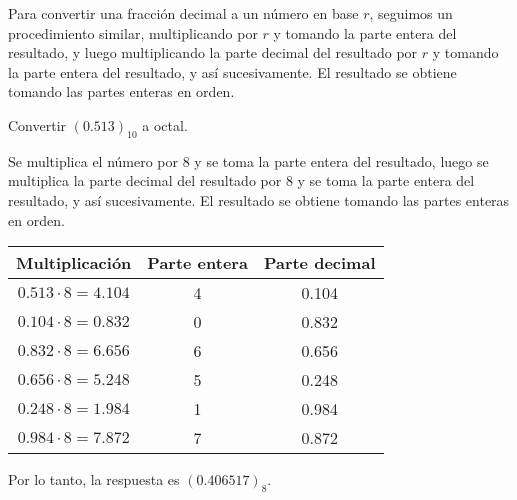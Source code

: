 \begin{observacion}
    Para convertir una fracción decimal a un número en base $r$, seguimos un procedimiento similar, multiplicando por $r$ y tomando la parte entera del resultado, y luego multiplicando la parte decimal del resultado por $r$ y tomando la parte entera del resultado, y así sucesivamente. El resultado se obtiene tomando las partes enteras en orden.
\end{observacion}

\begin{ejemplo}
    Convertir $(0.513)_{10}$ a octal. 
\end{ejemplo}
\begin{solution}
    Se multiplica el número por $8$ y se toma la parte entera del resultado, luego se multiplica la parte decimal del resultado por $8$ y se toma la parte entera del resultado, y así sucesivamente. El resultado se obtiene tomando las partes enteras en orden.
    \begin{table}[H]
        \centering
        \begin{tabular}{c|c|c}
            \textbf{Multiplicación} & \textbf{Parte entera} & \textbf{Parte decimal} \\ \hline
            $0.513 \cdot 8 = 4.104$ & 4                     & 0.104                  \\
            $0.104 \cdot 8 = 0.832$ & 0                     & 0.832                  \\
            $0.832 \cdot 8 = 6.656$ & 6                     & 0.656                  \\
            $0.656 \cdot 8 = 5.248$ & 5                     & 0.248                  \\
            $0.248 \cdot 8 = 1.984$ & 1                     & 0.984                  \\
            $0.984 \cdot 8 = 7.872$ & 7                     & 0.872                  \\
        \end{tabular}
    \end{table}
    Por lo tanto, la respuesta es $(0.406517)_{8}$.
\end{solution}

